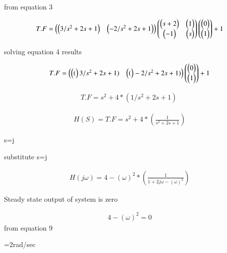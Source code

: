 \documentclass[a4,12pt,onecolumn]{IEEEtran}
\begin{document}
 from equation 3

\begin{align}
T.F=\begin{pmatrix} \begin{pmatrix}3/s^2+2s+1\end{pmatrix} & \begin{pmatrix}-2/s^2+2s+1\end{pmatrix} \\  \end{pmatrix}  
\begin{pmatrix} \begin{pmatrix}s+2\end{pmatrix} & \begin{pmatrix}1\end{pmatrix} \\ \begin{pmatrix}-1\end{pmatrix} & \begin{pmatrix}s\end{pmatrix}\end{pmatrix}\begin{pmatrix} \begin{pmatrix}0\end{pmatrix}\\ \begin{pmatrix}1\end{pmatrix} \end{pmatrix} +1
\end{align}  

solving equation 4 results

\vspace{1cm}
\begin{align}
T.F=\begin{pmatrix} \begin{pmatrix}(\end{pmatrix}3/s^2+2s+1) & \begin{pmatrix}(\end{pmatrix}-2/s^2+2s+1)  \\ \end{pmatrix}\begin{pmatrix}
\begin{pmatrix}0\end{pmatrix}\\ \begin{pmatrix}1\end{pmatrix} \end{pmatrix}+1
\end{align}
\vspace{1cm}

\begin{align}
T.F={s^2 + 4}*( 1/{s^2 + 2s + 1})\
\end{align}

\begin{align}
H(S)=T.F={s^2 + 4}*(\frac{1}{s^2+2s+1})
\end{align}
\vspace{3cm}

s=j\omega
\vspace{1cm}

substitute s=j\omega
  

\vspace{1cm}
\begin{align}
H(j\omega)={4-(\omega)^2}*(\frac{1}{1+2j\omega-(\omega)^2})
\end{align}
\vspace{1cm}


Steady state output of system is zero

\begin{align}
4-(\omega)^2=0
\end{align}
from equation 9


\omega=2rad/sec
\end{document}
